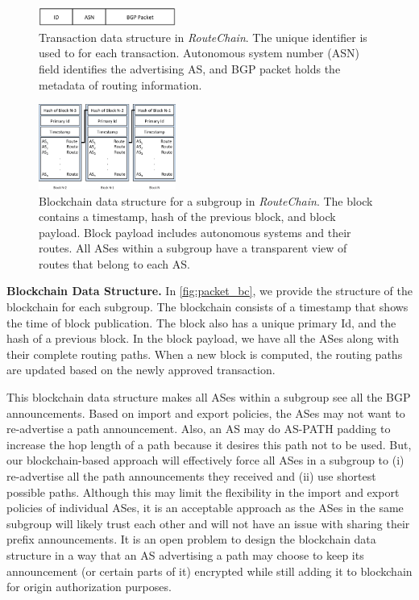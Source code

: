 \documentclass[conference]{IEEEtran}
\newcommand{\BfPara}[1]{{\noindent\bf#1.}\xspace}
\newcommand{\rc}{{{\em RouteChain}}\xspace}
\begin{document}
\begin{figure}[t]
\begin{center}
\includegraphics[width=0.40\textwidth]{fig/packet.pdf}
\caption{Transaction data structure in \rc. The unique identifier is used to for each transaction. Autonomous system number (ASN) field identifies the advertising AS, and BGP packet holds the metadata of routing information. } 
\label{fig:packet}
\end{center}
\end{figure}

\begin{figure}[t]
\begin{center}
\includegraphics[width=0.40\textwidth]{fig/blockchain.pdf}
\caption{Blockchain data structure for a subgroup in \rc. The block contains a timestamp, hash of the previous block, and block payload. Block payload includes autonomous systems and their routes. All ASes within a subgroup have a transparent view of routes that belong to each AS. } 
\label{fig:packet_bc}
\end{center}
\end{figure}




\BfPara{Blockchain Data Structure}
In \autoref{fig:packet_bc}, we provide the structure of the blockchain for each subgroup. The blockchain consists of a timestamp that shows the time of block publication. The block also has a unique primary Id, and the hash of a previous block. In the block payload, we have all the ASes along with their complete routing paths. When a new block is computed, the routing paths are updated based on the newly approved transaction.

This blockchain data structure makes all ASes within a subgroup see all the BGP announcements. Based on import and export policies, the ASes may not want to re-advertise a path announcement. Also, an AS may do AS-PATH padding to increase the hop length of a path because it desires this path not to be used. But, our blockchain-based approach will effectively force all ASes in a subgroup to (i) re-advertise all the path announcements they received and (ii) use shortest possible paths. Although this may limit the flexibility in the import and export policies of individual ASes, it is an acceptable approach as the ASes in the same subgroup will likely trust each other and will not have an issue with sharing their prefix announcements. It is an open problem to design the blockchain data structure in a way that an AS advertising a path may choose to keep its announcement (or certain parts of it) encrypted while still adding it to blockchain for origin authorization purposes.
\end{document}

